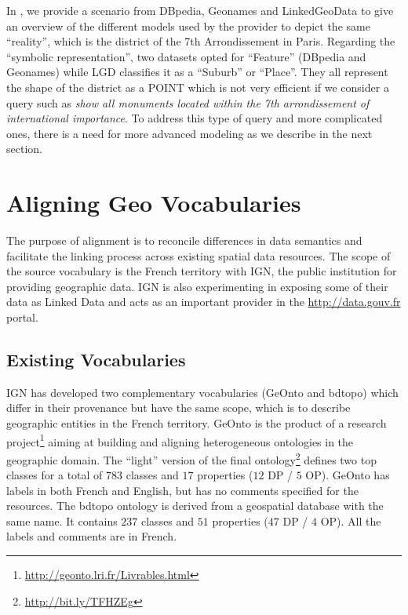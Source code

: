 \documentclass[a4paper,11pt]{report}
\begin{document}
In \cite{atemezing2012a}, we provide a scenario from DBpedia, Geonames and LinkedGeoData to give an overview of the different models used by the provider to depict the same ``reality'', which is the district of the 7th Arrondissement in Paris. Regarding the ``symbolic representation'', two datasets opted for ``Feature'' (DBpedia and Geonames) while LGD classifies it as a ``Suburb'' or ``Place''. They all represent the shape of the district as a POINT which is not very efficient if we consider a query such as \emph{show all monuments located within the 7th arrondissement of international importance}. To address this type of query and more complicated ones, there is a need for more advanced modeling as we describe in the next section.




\section{Aligning Geo Vocabularies}                                         \label{sec:alignment}
The purpose of alignment is to reconcile differences in data semantics and facilitate the linking process across existing spatial data resources. The scope of the source vocabulary is the French territory with IGN, the public institution for providing geographic data. IGN is   also experimenting in exposing some of their data as Linked Data and acts as an important provider in the \url{http://data.gouv.fr} portal.

\subsection{Existing Vocabularies}
IGN has developed two complementary vocabularies (GeOnto and bdtopo) which differ in their provenance but have the same scope, which is to describe geographic entities in the French territory. GeOnto is the product of a research project\footnote{\url{http://geonto.lri.fr/Livrables.html}} aiming at building and aligning heterogeneous ontologies in the geographic domain. The ``light'' version of the final ontology\footnote{\url{http://bit.ly/TFHZEg}} defines two top classes for a total of $783$ classes and $17$ properties ($12$ DP / $5$ OP). GeOnto has labels in both French and English, but has no comments specified for the resources. The bdtopo ontology is derived from a geospatial database with the same name. It contains $237$ classes and $51$ properties ($47$ DP / $4$ OP). All the labels and comments are in French.
\end{document}

